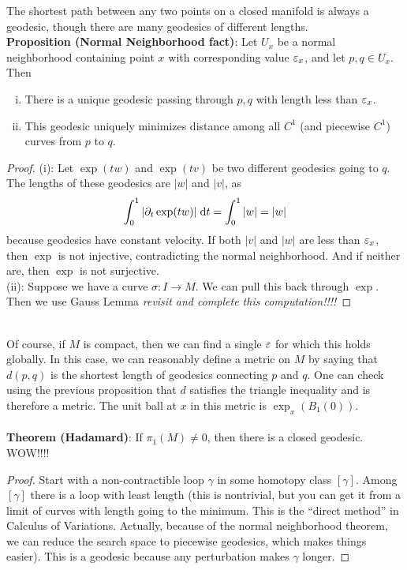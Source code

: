 \documentclass{amsart}
\begin{document}
	The shortest path between any two points on a closed manifold is always a geodesic, though there are many geodesics of different lengths.\\
	
	\textbf{Proposition (Normal Neighborhood fact)}: Let $U_x$ be a normal neighborhood containing point $x$ with corresponding value $\varepsilon_x$, and let $p,q\in U_x$. Then
	\begin{enumerate}[(i)]
		\item There is a unique geodesic passing through $p,q$ with length less than $\varepsilon_x$.
		\item This geodesic uniquely minimizes distance among all $C^1$ (and piecewise $C^1$) curves from $p$ to $q$.
	\end{enumerate}
	\begin{proof}
		(i): Let $\exp(tw)$ and $\exp(tv)$ be two different geodesics going to $q$. The lengths of these geodesics are $|w|$ and $|v|$, as
		$$
		\int_0^1 |\partial_t \exp(tw)|\; \textrm{d} t = \int_0^1 |w| = |w| 
		$$ 
		because geodesics have constant velocity. If both $|v|$ and $|w|$ are less than $\varepsilon_x$, then $\exp$ is not injective, contradicting the normal neighborhood. And if neither are, then $\exp$ is not surjective.\\
		
		(ii): Suppose we have a curve $\sigma:I\to M$. We can pull this back through $\exp$. Then we use Gauss Lemma \textit{revisit and complete this computation!!!!}
	\end{proof}\\
	
	Of course, if $M$ is compact, then we can find a single $\varepsilon$ for which this holds globally. In this case, we can reasonably define a metric on $M$ by saying that $d(p,q)$ is the shortest length of geodesics connecting $p$ and $q$. One can check using the previous proposition that $d$ satisfies the triangle inequality and is therefore a metric. The unit ball at $x$ in this metric is $\exp_x(B_1(0))$.\\
	
	\\

	\textbf{Theorem (Hadamard)}: If $\pi_1(M)\neq 0$, then there is a closed geodesic. WOW!!!!
	\begin{proof}
		Start with a non-contractible loop $\gamma$ in some homotopy class $[\gamma]$. Among $[\gamma]$ there is a loop with least length (this is nontrivial, but you can get it from a limit of curves with length going to the minimum. This is the ``direct method'' in Calculus of Variations. Actually, because of the normal neighborhood theorem, we can reduce the search space to piecewise geodesics, which makes things easier). This is a geodesic because any perturbation makes $\gamma$ longer.
	\end{proof}\\
	
\end{document}
